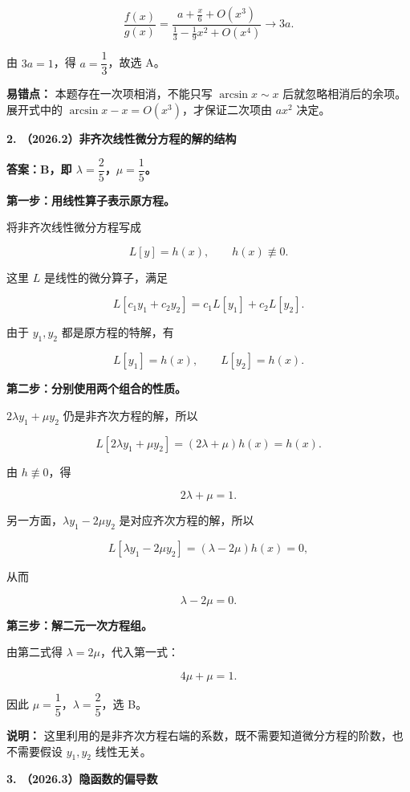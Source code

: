 \documentclass[UTF8,11pt,fontset=windows]{ctexart}
\begin{document}
$$
\frac{f(x)}{g(x)}
=\frac{a+\frac{x}{6}+O(x^3)}{\frac13-\frac19x^2+O(x^4)}
\longrightarrow3a.
$$

由 $3a=1$，得 $a=\dfrac13$，故选 A。

\textbf{易错点：} 本题存在一次项相消，不能只写 $\arcsin x\sim x$ 后就忽略相消后的余项。展开式中的 $\arcsin x-x=O(x^3)$，才保证二次项由 $ax^2$ 决定。

\clearpage

\textbf{2. （2026.2）非齐次线性微分方程的解的结构}

\textbf{答案：B，即 $\lambda=\dfrac25$，$\mu=\dfrac15$。}

\textbf{第一步：用线性算子表示原方程。}

将非齐次线性微分方程写成

$$
L[y]=h(x),\qquad h(x)\not\equiv0.
$$

这里 $L$ 是线性的微分算子，满足

$$
L[c_1y_1+c_2y_2]=c_1L[y_1]+c_2L[y_2].
$$

由于 $y_1,y_2$ 都是原方程的特解，有

$$
L[y_1]=h(x),\qquad L[y_2]=h(x).
$$

\textbf{第二步：分别使用两个组合的性质。}

$2\lambda y_1+\mu y_2$ 仍是非齐次方程的解，所以

$$
L[2\lambda y_1+\mu y_2]=(2\lambda+\mu)h(x)=h(x).
$$

由 $h\not\equiv0$，得

$$
2\lambda+\mu=1.
$$

另一方面，$\lambda y_1-2\mu y_2$ 是对应齐次方程的解，所以

$$
L[\lambda y_1-2\mu y_2]=(\lambda-2\mu)h(x)=0,
$$

从而

$$
\lambda-2\mu=0.
$$

\textbf{第三步：解二元一次方程组。}

由第二式得 $\lambda=2\mu$，代入第一式：

$$
4\mu+\mu=1.
$$

因此 $\mu=\dfrac15$，$\lambda=\dfrac25$，选 B。

\textbf{说明：} 这里利用的是非齐次方程右端的系数，既不需要知道微分方程的阶数，也不需要假设 $y_1,y_2$ 线性无关。

\clearpage

\textbf{3. （2026.3）隐函数的偏导数}
\end{document}
